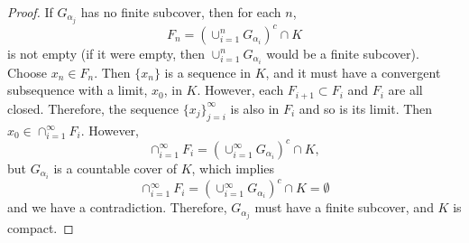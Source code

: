 \begin{proof}
  If $G_{\alpha_j}$ has no finite subcover, then for each $n$, 
  \[ F_n = \left(\cup_{i=1}^n G_{\alpha_i}\right)^c \cap K \] is not
  empty (if it were empty, then $\cup_{i=1}^n G_{\alpha_i}$ would be a
  finite subcover). Choose $x_n \in F_n$. Then $\{x_n\}$ is a sequence in $K$,
  and it must have a convergent subsequence with a limit, $x_0$, in
  $K$. However, each $F_{i+1} \subset F_i$ and $F_i$ are all
  closed. Therefore, the sequence $\{x_j\}_{j=i}^\infty$ is also in
  $F_i$ and so is its limit. Then $x_0 \in \cap_{i=1}^\infty
  F_i$. However, 
  \[ \cap_{i=1}^\infty F_i = \left(\cup_{i=1}^\infty
    G_{\alpha_i}\right)^c \cap K, \]  
  but $G_{\alpha_i}$ is a countable cover of $K$, which implies 
  \[ \cap_{i=1}^\infty F_i = \left(\cup_{i=1}^\infty
    G_{\alpha_i}\right)^c \cap K = \emptyset\] 
  and we have a contradiction. Therefore, $G_{\alpha_j}$ must have a
  finite subcover, and $K$ is compact.
\end{proof}

